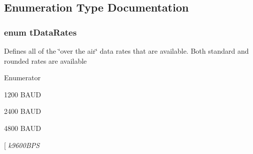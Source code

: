 \subsection{Enumeration Type Documentation}
\hypertarget{group___radio_ga8ca09000106eab66e7f5a4998107f805}{
\subsubsection[{t\-Data\-Rates}]{\setlength{\rightskip}{0pt plus 5cm}enum {\bf t\-Data\-Rates}}}\label{group___radio_ga8ca09000106eab66e7f5a4998107f805}
Defines all of the \char`\"{}over the air\char`\"{} data rates that are available. Both standard and rounded rates are available \begin{Desc}
\item[Enumerator]\par
\begin{description}
\item[{\em 
\hypertarget{group___radio_gga8ca09000106eab66e7f5a4998107f805a7e15671135d49305cdb4aad417786c18}{k1200\-B\-P\-S}\label{group___radio_gga8ca09000106eab66e7f5a4998107f805a7e15671135d49305cdb4aad417786c18}
}]1200 B\-A\-U\-D \item[{\em 
\hypertarget{group___radio_gga8ca09000106eab66e7f5a4998107f805adbbb374a9a080b76548af7683da68b29}{k2400\-B\-P\-S}\label{group___radio_gga8ca09000106eab66e7f5a4998107f805adbbb374a9a080b76548af7683da68b29}
}]2400 B\-A\-U\-D \item[{\em 
\hypertarget{group___radio_gga8ca09000106eab66e7f5a4998107f805a023ffe0b4bbe00860a2ed860922a937a}{k4800\-B\-P\-S}\label{group___radio_gga8ca09000106eab66e7f5a4998107f805a023ffe0b4bbe00860a2ed860922a937a}
}]4800 B\-A\-U\-D \item[{\em 
\hypertarget{group___radio_gga8ca09000106eab66e7f5a4998107f805abf49e6adc1c2aad4dffd53d6be7379c5}{k9600\-B\-P\-S}\label{group___radio_gga8ca09000106eab66e7f5a4998107f805abf49e6adc1c2aad4dffd53d6be7379c5}
}
\end{description}
\end{Desc}

